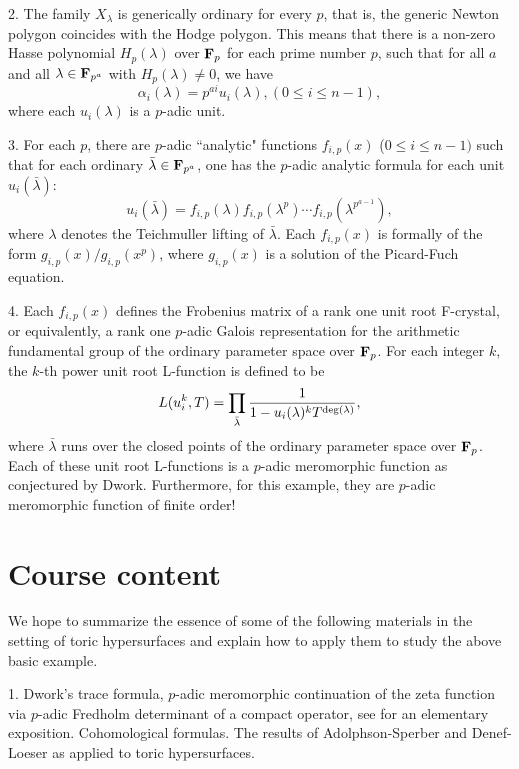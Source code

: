 \documentclass[10XSpt]{article}
\begin{document}
2. The family $X_{\lambda}$ is generically ordinary for every $p$, that is, 
the generic Newton polygon coincides with the Hodge polygon.  
This means that there is a non-zero Hasse polynomial $H_p(\lambda)$ over ${\bf F}_p$ 
for each prime number $p$, 
such that for all $a$ and all $\lambda \in {\bf F}_{p^a}$  
with $H_p(\lambda)\not=0$, we have 
$$\alpha_i(\lambda) = p^{ai}u_i(\lambda), (0\leq i\leq n-1),$$
where each $u_i(\lambda)$ is a $p$-adic unit.  

3. For each $p$, there are $p$-adic ``analytic" 
functions $f_{i,p}(x)$ ($0\leq i \leq n-1)$  
such that for each ordinary $\bar{\lambda} \in {\bf F}_{p^a}$, one has the 
$p$-adic analytic formula for each unit $u_i(\bar{\lambda})$:  
$$u_i(\bar{\lambda}) = f_{i,p}(\lambda) f_{i,p}(\lambda^p)\cdots 
f_{i,p}(\lambda^{p^{a-1}}),$$
where $\lambda$ denotes the Teichmuller lifting of $\bar{\lambda}$. 
Each $f_{i,p}(x)$ is formally of the form $g_{i,p}(x)/g_{i,p}(x^p)$, 
where $g_{i,p}(x)$ is a solution of the Picard-Fuch equation. 

4. Each $f_{i,p}(x)$ defines the Frobenius matrix of 
a rank one unit root F-crystal, or equivalently, 
a rank one $p$-adic Galois representation for the arithmetic fundamental 
group of the ordinary parameter space over ${\bf F}_p$. For each integer $k$, 
the $k$-th power unit root L-function 
is defined to be 
$$L(u_i^k, T) =\prod_{\bar{\lambda}}{1\over 1-u_i(\lambda)^k T^{{\rm deg}(\lambda)}},
$$
where $\bar{\lambda}$ runs over the closed points of the ordinary parameter space 
over ${\bf F}_p$. Each of these unit root L-functions is a $p$-adic 
meromorphic function as conjectured by Dwork. Furthermore, for this example, 
they are $p$-adic meromorphic function of finite order!    

\section{Course content}


We hope to summarize the essence of some of the following materials 
in the setting of toric hypersurfaces and explain how to apply them 
to study the above basic example. 

1. Dwork's trace formula, $p$-adic meromorphic continuation 
of the zeta function via $p$-adic Fredholm determinant of 
a compact operator, see \cite{W2} for an elementary exposition.  
Cohomological formulas.  The results of 
Adolphson-Sperber \cite{AS} and Denef-Loeser \cite{DL} as applied 
to toric hypersurfaces.  
\end{document}

